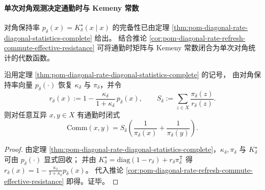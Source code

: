 \paragraph{单次对角观测决定通勤时与 Kemeny 常数}
对角保持率 \(p_\delta(x)=K^\star_\delta(x\mid x)\) 的完备性已由定理 \ref{thm:pom-diagonal-rate-diagonal-statistics-complete} 给出。
结合推论 \ref{cor:pom-diagonal-rate-refresh-commute-effective-resistance} 可将通勤时矩阵与 Kemeny 常数闭合为单次对角统计的代数函数。

\begin{corollary}[对角保持率决定全通勤时矩阵]\label{cor:pom-diagonal-rate-diagonal-determines-commute}
沿用定理 \ref{thm:pom-diagonal-rate-diagonal-statistics-complete} 的记号，
由对角保持率向量 \(p_\delta(\cdot)\) 恢复 \(\kappa_\delta\) 与 \(\pi_\delta\)，并令
\[
r_\delta(x):=1-\frac{\kappa_\delta}{1+\kappa_\delta}\,p_\delta(x),
\qquad
S_\delta:=\sum_{z\in X}\frac{\pi_\delta(z)}{r_\delta(z)}.
\]
则对任意互异 \(x,y\in X\) 有通勤时闭式
\[
\mathrm{Comm}(x,y)=S_\delta\left(\frac{1}{\pi_\delta(x)}+\frac{1}{\pi_\delta(y)}\right).
\]
\end{corollary}
\begin{proof}
由定理 \ref{thm:pom-diagonal-rate-diagonal-statistics-complete}，\(\kappa_\delta,\pi_\delta\) 与 \(K^\star_\delta\) 可由 \(p_\delta(\cdot)\) 显式回收；
并由 \(K^\star_\delta=\mathrm{diag}(1-r_\delta)+r_\delta\pi_\delta^{\mathsf T}\) 得 \(r_\delta(x)=1-\frac{\kappa_\delta}{1+\kappa_\delta}p_\delta(x)\)。
代入推论 \ref{cor:pom-diagonal-rate-refresh-commute-effective-resistance} 即得。证毕。
\end{proof}

